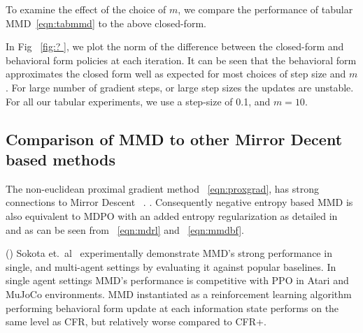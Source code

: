 To examine the effect of the choice of $m$, we compare the performance of
tabular MMD~\ref{eqn:tabmmd} to the above closed-form.

In Fig~ \ref{fig:?
}, we plot the norm of the difference between the closed-form and behavioral form policies at each iteration.
It can be seen that the behavioral form approximates the closed form well as expected for most
choices of step size and $m$.
For large number of gradient steps, or large step sizes the updates are unstable.
For all our tabular experiments, we use a step-size of 0.1, and $m=10$.

\subsection{Comparison of MMD to other Mirror Decent based methods}

The non-euclidean proximal gradient method~ \ref{eqn:proxgrad}, has strong connections to Mirror
Descent~ \cite[Appendix D.3]{sokotaUnified2023}.
.
Consequently negative entropy based MMD is also equivalent to MDPO with an added entropy
regularization as detailed in~ \cite[Appendix L]{sokotaUnified2023} and as can be seen from~
\ref{eqn:mdrl} and~ \ref{eqn:mmdbf}.

()
Sokota et.~al~\cite{sokotaUnified2023} experimentally demonstrate MMD's strong performance in single, and
multi-agent settings by evaluating it against popular baselines.
In single agent settings MMD's performance is competitive with PPO in Atari and MuJoCo
environments.
MMD instantiated as a reinforcement learning algorithm performing behavioral form update at each
information state performs on the same level as CFR, but relatively worse compared to CFR+.
